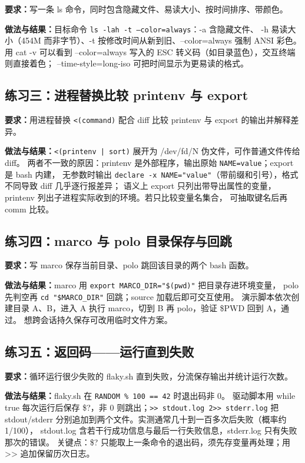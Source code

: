 \documentclass[UTF8]{ctexart}
\begin{document}
\noindent\textbf{要求：}写一条 ls 命令，同时包含隐藏文件、易读大小、按时间排序、带颜色。

\noindent\textbf{做法与结果：}目标命令 \texttt{ls -lah -t --color=always}：-a 含隐藏文件、
-h 易读大小（454M 而非字节）、-t 按修改时间从新到旧、--color=always 强制 ANSI 彩色。
用 cat -v 可以看到 --color=always 写入的 ESC 转义码（如目录蓝色），交互终端则直接着色；
--time-style=long-iso 可把时间显示为更易读的格式。

\subsection{练习三：进程替换比较 printenv 与 export}

\noindent\textbf{要求：}用进程替换 \texttt{<(command)} 配合 diff 比较 printenv 与 export 的输出并解释差异。

\noindent\textbf{做法与结果：}\texttt{<(printenv | sort)} 展开为 /dev/fd/N 伪文件，可作普通文件传给 diff。
两者不一致的原因：printenv 是外部程序，输出原始 \texttt{NAME=value}；export 是 bash 内建，
无参数时输出 \texttt{declare -x NAME="value"}（带前缀和引号），格式不同导致 diff 几乎逐行报差异；
语义上 export 只列出带导出属性的变量，printenv 列出子进程实际收到的环境。若只比较变量名集合，
可抽取键名后再 comm 比较。

\subsection{练习四：marco 与 polo 目录保存与回跳}

\noindent\textbf{要求：}写 marco 保存当前目录、polo 跳回该目录的两个 bash 函数。

\noindent\textbf{做法与结果：}marco 用 \texttt{export MARCO\_DIR="\$(pwd)"} 把目录存进环境变量，
polo 先判空再 \texttt{cd "\$MARCO\_DIR"} 回跳；source 加载后即可交互使用。
演示脚本依次创建目录 A、B，进入 A 执行 marco，切到 B 再 polo，验证 \$PWD 回到 A，通过。
想跨会话持久保存可改用临时文件方案。

\subsection{练习五：返回码——运行直到失败}

\noindent\textbf{要求：}循环运行很少失败的 flaky.sh 直到失败，分流保存输出并统计运行次数。

\noindent\textbf{做法与结果：}flaky.sh 在 \texttt{RANDOM \% 100 == 42} 时退出码非 0。
驱动脚本用 while true 每次运行后保存 \$?，非 0 则跳出；\texttt{>> stdout.log 2>> stderr.log}
把 stdout/stderr 分别追加到两个文件。实测通常几十到一百多次后失败（概率约 1/100），
stdout.log 含若干行成功信息与最后一行失败信息，stderr.log 只有失败那次的错误。
关键点：\$? 只能取上一条命令的退出码，须先存变量再处理；用 >> 追加保留历次日志。
\end{document}
